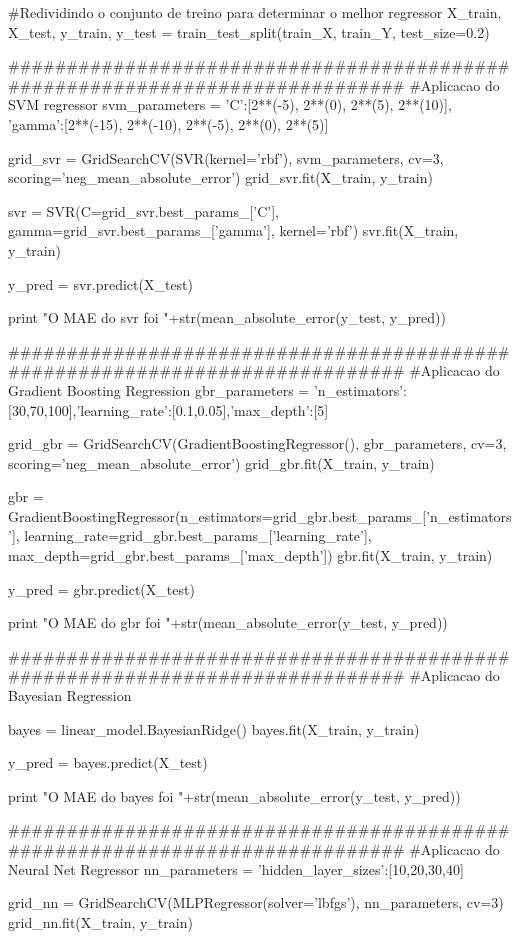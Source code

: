 \documentclass{article}
\begin{document}
\begin{python}
#Redividindo o conjunto de treino para determinar o melhor regressor
X_train, X_test, y_train, y_test = train_test_split(train_X, train_Y, test_size=0.2)

#############################################################################
#Aplicacao do SVM regressor
svm_parameters = {'C':[2**(-5), 2**(0), 2**(5), 2**(10)],
 'gamma':[2**(-15), 2**(-10), 2**(-5), 2**(0), 2**(5)]}

grid_svr = GridSearchCV(SVR(kernel='rbf'), svm_parameters, cv=3,
	scoring='neg_mean_absolute_error')
grid_svr.fit(X_train, y_train)

svr = SVR(C=grid_svr.best_params_['C'], gamma=grid_svr.best_params_['gamma'], kernel='rbf')
svr.fit(X_train, y_train)

y_pred = svr.predict(X_test)

print "O MAE do svr foi "+str(mean_absolute_error(y_test, y_pred))

#############################################################################
#Aplicacao do Gradient Boosting Regression
gbr_parameters = {'n_estimators':[30,70,100],'learning_rate':[0.1,0.05],'max_depth':[5]}

grid_gbr = GridSearchCV(GradientBoostingRegressor(), gbr_parameters, cv=3,
	scoring='neg_mean_absolute_error')
grid_gbr.fit(X_train, y_train)

gbr = GradientBoostingRegressor(n_estimators=grid_gbr.best_params_['n_estimators'],
	 learning_rate=grid_gbr.best_params_['learning_rate'],
	  max_depth=grid_gbr.best_params_['max_depth'])
gbr.fit(X_train, y_train)

y_pred = gbr.predict(X_test)

print "O MAE do gbr foi "+str(mean_absolute_error(y_test, y_pred))

#############################################################################
#Aplicacao do Bayesian Regression

bayes = linear_model.BayesianRidge()
bayes.fit(X_train, y_train)

y_pred = bayes.predict(X_test)

print "O MAE do bayes foi "+str(mean_absolute_error(y_test, y_pred))

#############################################################################
#Aplicacao do Neural Net Regressor
nn_parameters = {'hidden_layer_sizes':[10,20,30,40]}

grid_nn = GridSearchCV(MLPRegressor(solver='lbfgs'), nn_parameters, cv=3)
grid_nn.fit(X_train, y_train)


\end{python}
\end{document}
